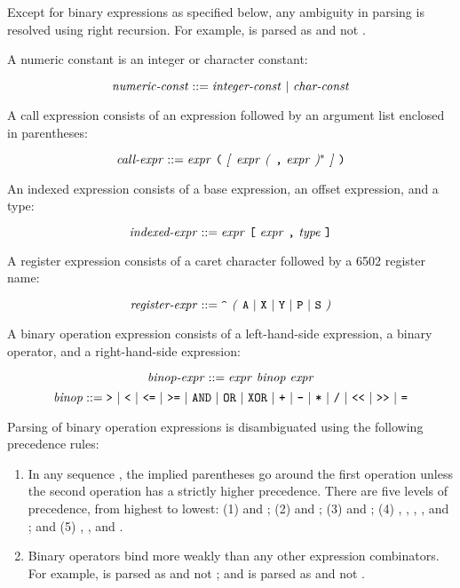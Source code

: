 \documentclass[10pt]{article}
\begin{document}
\noindent
Except for binary expressions as specified below, any ambiguity in
parsing is resolved using right recursion.  For example,  is
parsed as  and not .

  A numeric constant is an integer or
character constant:

$$\mbox{\textit{numeric-const}} ::= \mbox{\ensuremath{\mbox{\textit{integer-const}}} $|$
  \ensuremath{\mbox{\textit{char-const}}}}$$

 A call expression consists of an expression
followed by an argument list enclosed in parentheses:

$$\mbox{\textit{call-expr}} ::= \mbox{\ensuremath{\mbox{\textit{expr}}} \texttt{(}
  \textit{[} \ensuremath{\mbox{\textit{expr}}} \textit{(} \texttt{,} \ensuremath{\mbox{\textit{expr}}} \textit{)}$^*$ \textit{]} \texttt{)}}$$

 An indexed expression consists of a
base expression, an offset expression, and a type:

$$\mbox{\textit{indexed-expr}} ::= \mbox{\ensuremath{\mbox{\textit{expr}}} \texttt{[}
    \ensuremath{\mbox{\textit{expr}}} \texttt{,} \ensuremath{\mbox{\textit{type}}} \texttt{]}}$$

 A register expression consists of a
caret character followed by a 6502 register name:

$$\mbox{\textit{register-expr}} ::= \mbox{\texttt{\textasciicircum} \textit{(} \texttt{A} $|$
    \texttt{X} $|$ \texttt{Y} $|$ \texttt{P} $|$ \texttt{S} \textit{)}}$$

 A binary operation expression
consists of a left-hand-side expression, a binary operator, and a
right-hand-side expression:

$$\mbox{\textit{binop-expr}} ::= \mbox{\ensuremath{\mbox{\textit{expr}}} \ensuremath{\mbox{\textit{binop}}} \ensuremath{\mbox{\textit{expr}}}}$$
%
$$\mbox{\textit{binop}} ::= \mbox{\texttt{>} $|$ \texttt{<} $|$ \texttt{<=} $|$
  \texttt{>=} $|$ \texttt{AND} $|$ \texttt{OR} $|$ \texttt{XOR} $|$ \texttt{+} $|$
  \texttt{-} $|$ \texttt{*} $|$ \texttt{/} $|$ \texttt{<}\texttt{<}~$|$ \texttt{>}\texttt{>}~$|$
  \texttt{=}}$$

\noindent
Parsing of binary operation expressions is disambiguated using the
following precedence rules:

\begin{enumerate}
%
\item In any sequence  
    , the implied
  parentheses go around the first operation unless the second
  operation has a strictly higher precedence.  There are five levels
  of precedence, from highest to lowest: (1) \kwd{<}\kwd{<} and \kwd{>}\kwd{>};
  (2) \kwd{*} and \kwd{\bs}; (3) \kwd{+} and \kwd{-}; (4) \kwd{=},
  \kwd{>}, \kwd{<}, \kwd{<=}, and \kwd{>=}; and (5) ,
  , and .
%
\item Binary operators bind more weakly than any other expression
  combinators.  For example,  is parsed as 
  and not ; and  is parsed as  and
  not .
%
\end{enumerate}
\end{document}
